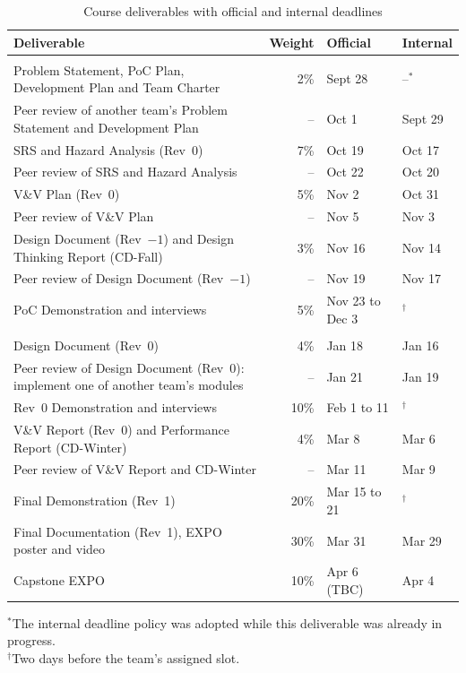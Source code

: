 \documentclass{article}
\begin{document}
\begin{table}[!htbp]
\centering
\caption{Course deliverables with official and internal deadlines}
\label{TblSchedule}
\small
\renewcommand{\arraystretch}{1.2}
\begin{tabularx}{\textwidth}{>{\raggedright\arraybackslash}Xrll}
\toprule
\textbf{Deliverable} & \textbf{Weight} & \textbf{Official} & \textbf{Internal}\\
\midrule
\multicolumn{4}{l}{\textit{Fall term, 2026}}\\
Problem Statement, PoC Plan, Development Plan and Team Charter & 2\% &
  Sept 28 & --$^{*}$\\
Peer review of another team's Problem Statement and Development Plan & -- &
  Oct 1 & Sept 29\\
SRS and Hazard Analysis (Rev~0) & 7\% & Oct 19 & Oct 17\\
Peer review of SRS and Hazard Analysis & -- & Oct 22 & Oct 20\\
V\&V Plan (Rev~0) & 5\% & Nov 2 & Oct 31\\
Peer review of V\&V Plan & -- & Nov 5 & Nov 3\\
Design Document (Rev~$-1$) and Design Thinking Report (CD-Fall) & 3\% &
  Nov 16 & Nov 14\\
Peer review of Design Document (Rev~$-1$) & -- & Nov 19 & Nov 17\\
PoC Demonstration and interviews & 5\% & Nov 23 to Dec 3 & $^{\dagger}$\\
\midrule
\multicolumn{4}{l}{\textit{Winter term, 2027}}\\
Design Document (Rev~0) & 4\% & Jan 18 & Jan 16\\
Peer review of Design Document (Rev~0): implement one of another team's
  modules & -- & Jan 21 & Jan 19\\
Rev~0 Demonstration and interviews & 10\% & Feb 1 to 11 &
  $^{\dagger}$\\
V\&V Report (Rev~0) and Performance Report (CD-Winter) & 4\% & Mar 8 &
  Mar 6\\
Peer review of V\&V Report and CD-Winter & -- & Mar 11 & Mar 9\\
Final Demonstration (Rev~1) & 20\% & Mar 15 to 21 & $^{\dagger}$\\
Final Documentation (Rev~1), EXPO poster and video & 30\% & Mar 31 &
  Mar 29\\
Capstone EXPO & 10\% & Apr 6 (TBC) & Apr 4\\
\bottomrule
\end{tabularx}

\vspace{2pt}
\raggedright
{\footnotesize $^{*}$The internal deadline policy was adopted while this
deliverable was already in progress.\\
$^{\dagger}$Two days before the team's assigned slot.}
\end{table}
\end{document}
